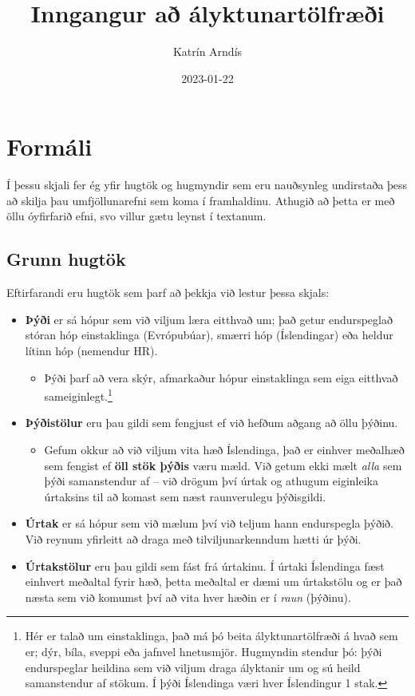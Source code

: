 \documentclass[
]{book}
\title{Inngangur að ályktunartölfræði}
\author{Katrín Arndís}
\date{2023-01-22}
\providecommand{\tightlist}{%
  \setlength{\itemsep}{0pt}\setlength{\parskip}{0pt}}
\begin{document}
\maketitle

{
\setcounter{tocdepth}{1}
\tableofcontents
}
\hypertarget{formuxe1li}{%
\chapter{Formáli}\label{formuxe1li}}

Í þessu skjali fer ég yfir hugtök og hugmyndir sem eru nauðsynleg
undirstaða þess að skilja þau umfjöllunarefni sem koma í framhaldinu.
Athugið að þetta er með öllu óyfirfarið efni, svo villur gætu leynst í
textanum.

\hypertarget{grunn-hugtuxf6k}{%
\section{Grunn hugtök}\label{grunn-hugtuxf6k}}

Eftirfarandi eru hugtök sem þarf að þekkja við lestur þessa skjals:

\begin{itemize}
\tightlist
\item
  \textbf{Þýði} er sá hópur sem við viljum læra eitthvað um; það getur
  endurspeglað stóran hóp einstaklinga (Evrópubúar), smærri hóp
  (Íslendingar) eða heldur lítinn hóp (nemendur HR).

  \begin{itemize}
  \tightlist
  \item
    Þýði þarf að vera skýr, afmarkaður hópur einstaklinga sem eiga
    eitthvað sameiginlegt.\footnote{Hér er talað um einstaklinga, það má þó beita
      ályktunartölfræði á hvað sem er; dýr, bíla, sveppi eða jafnvel
      hnetusmjör. Hugmyndin stendur þó: þýði endurspeglar heildina sem við
      viljum draga ályktanir um og sú heild samanstendur af stökum. Í þýði
      Íslendinga væri hver Íslendingur 1 stak.}
  \end{itemize}
\item
  \textbf{Þýðistölur} eru þau gildi sem fengjust ef við hefðum aðgang að
  öllu þýðinu.

  \begin{itemize}
  \tightlist
  \item
    Gefum okkur að við viljum vita hæð Íslendinga, það er einhver
    meðalhæð sem fengist ef \textbf{öll stök þýðis} væru mæld. Við getum
    ekki mælt \emph{alla} sem þýði samanstendur af -- við drögum því
    úrtak og athugum eiginleika úrtaksins til að komast sem næst
    raunverulegu þýðisgildi.
  \end{itemize}
\item
  \textbf{Úrtak} er sá hópur sem við mælum því við teljum hann endurspegla
  þýðið. Við reynum yfirleitt að draga með tilviljunarkenndum hætti úr
  þýði.
\item
  \textbf{Úrtakstölur} eru þau gildi sem fást frá úrtakinu. Í úrtaki
  Íslendinga fæst einhvert meðaltal fyrir hæð, þetta meðaltal er dæmi
  um úrtakstölu og er það næsta sem við komumst því að vita hver hæðin
  er í \emph{raun} (þýðinu).
\end{itemize}
\end{document}

